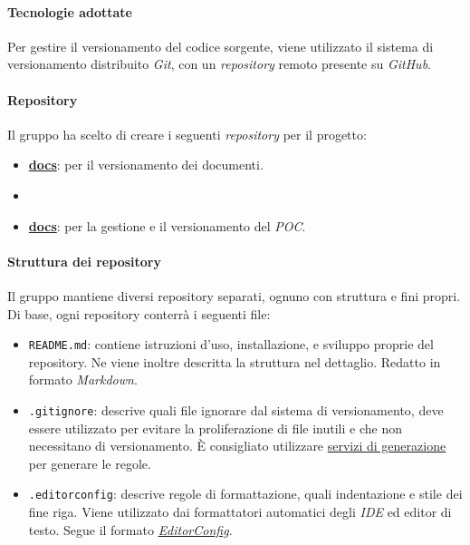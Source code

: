 		\paragraph*{Tecnologie adottate}
		\aCapo{}  
			Per gestire il versionamento del codice sorgente, viene utilizzato il sistema di versionamento distribuito \emph{Git}, con un \emph{repository} remoto presente su \emph{GitHub}.
			
		\paragraph*{Repository}
		\aCapo{}
			Il gruppo \teamname{} ha scelto di creare i seguenti \emph{repository} per il progetto:
			\begin{itemize}
				\item \href{https://github.com/Bug-s-Bunny-Team/docs}{\textbf{docs}}: per il versionamento dei documenti.
				\item \item \href{https://github.com/Bug-s-Bunny-Team/poc}{\textbf{docs}}: per la gestione e il versionamento del \textit{POC}.
			\end{itemize}

		\paragraph*{Struttura dei repository} %
		\aCapo{}  
		Il gruppo mantiene diversi repository separati, ognuno con struttura e fini propri.
		Di base, ogni repository conterrà i seguenti file:
		\begin{itemize}
			\item \verb#README.md#: contiene istruzioni d'uso, installazione, e sviluppo proprie del repository. Ne viene inoltre descritta la struttura nel dettaglio. Redatto in formato \textit{Markdown}.
			\item \verb#.gitignore#: descrive quali file ignorare dal sistema di versionamento, deve essere utilizzato per evitare la proliferazione di file inutili e che non necessitano di versionamento. È consigliato utilizzare \href{https://www.toptal.com/developers/gitignore}{servizi di generazione} per generare le regole.
			\item \verb#.editorconfig#: descrive regole di formattazione, quali indentazione e stile dei fine riga. Viene utilizzato dai formattatori automatici degli \textit{IDE} ed editor di testo. Segue il formato \href{https://editorconfig.org/}{\textit{EditorConfig}}.
		\end{itemize}

